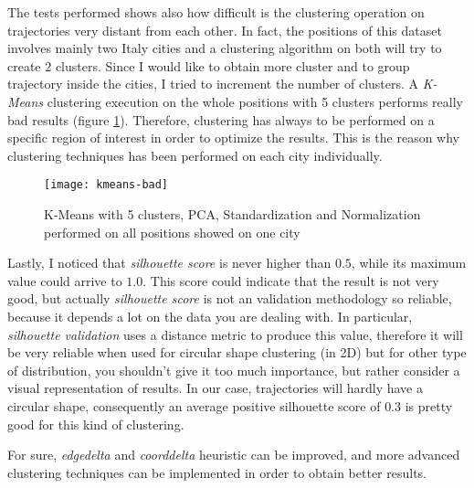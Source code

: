 The tests performed shows also how difficult is the clustering operation on trajectories very distant from each other. In fact, the positions of this dataset involves mainly two Italy cities and a clustering algorithm on both will try to create 2 clusters. Since I would like to obtain more cluster and to group trajectory inside the cities, I tried to increment the number of clusters. A \textit{K-Means} clustering execution on the whole positions with 5 clusters performs really bad results (figure \ref{fig:kmeans-bad}). Therefore, clustering has always to be performed on a specific region of interest in order to optimize the results. This is the reason why clustering techniques has been performed on each city individually.

\begin{figure}[bt]
	\centering
	\texttt{[image: kmeans-bad]}
	\caption{K-Means with 5 clusters, PCA, Standardization and Normalization performed on all positions showed on one city}
	\label{fig:kmeans-bad}
\end{figure}

Lastly, I noticed that \textit{silhouette score} is never higher than $0.5$, while its maximum value could arrive to $1.0$. This score could indicate that the result is not very good, but actually \textit{silhouette score} is not an validation methodology so reliable, because it depends a lot on the data you are dealing with. In particular, \textit{silhouette validation} uses a distance metric to produce this value, therefore it will be very reliable when used for circular shape clustering (in 2D) but for other type of distribution, you shouldn't give it too much importance, but rather consider a visual representation of results. In our case, trajectories will hardly have a circular shape, consequently an average positive silhouette score of $0.3$ is pretty good for this kind of clustering.

For sure, \textit{edgedelta} and \textit{coorddelta} heuristic can be improved, and more advanced clustering techniques can be implemented in order to obtain better results. 